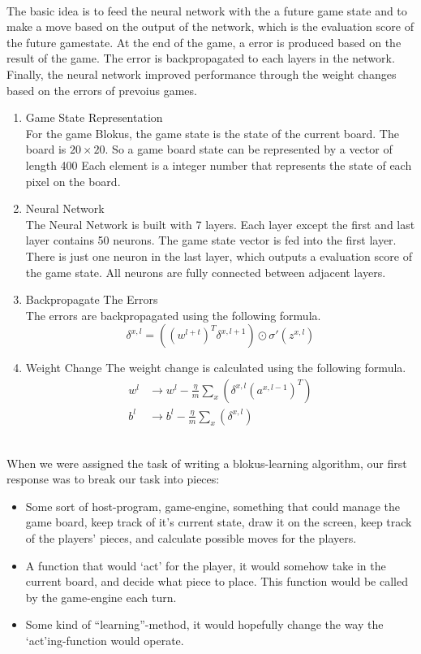 \documentclass{report}
\begin{document}
	\\
	The basic idea is to feed the neural network with the a future game state and to make a move based on the output of the network, which is the evaluation score of the future gamestate.
	At the end of the game, a error is produced based on the result of the game. The error is backpropagated to each layers in the network. Finally, the neural network improved performance through
	the weight changes based on the errors of prevoius games.
	\begin{enumerate}
		\item Game State Representation\\
			For the game Blokus, the game state is the state of the current board. The board is $20\times20$. So a game board state can be represented by a vector of length 400
			Each element is a integer number that represents the state of each pixel on the board. 
		\item Neural Network\\
			The Neural Network is built with 7 layers. Each layer except the first and last layer contains 50 neurons. The game state vector is fed into the first layer. There is just one
			neuron in the last layer, which outputs a evaluation score of the game state. All neurons are fully connected between adjacent layers. 
		\item Backpropagate The Errors\\
			The errors are backpropagated using the following formula.
				\begin{equation*}
				\delta^{x, l} = \left( \left( w^{l+t} \right)^T \delta^{x, l+1} \right) \odot  \sigma'\left( z^{x, l}\right)
				\end{equation*}
		\item Weight Change
			The weight change is calculated using the following formula.
				\begin{align*}
					w^l &\rightarrow w^l - \frac{\eta}{m} \sum_{x} \left(\delta^{x, l} \left( a^{x, l-1}\right) ^T\right) \\
					b^l &\rightarrow b^l - \frac{\eta}{m} \sum_{x} \left(\delta^{x, l}\right)
				\end{align*}
	\end{enumerate}
	\\
	When we were assigned the task of writing a blokus-learning algorithm, our first response was to break our task into pieces:
	\begin{itemize}
		\item Some sort of host-program, game-engine, something that could manage the game board, keep track of it's current state, draw it on the screen, keep track of the players' pieces,
			and calculate possible moves for the players.
		\item A function that would `act' for the player, it would somehow take in the current board, and decide what piece to place. This function would be called by the game-engine each
			turn.
		\item Some kind of ``learning''-method, it would hopefully change the way the `act'ing-function would operate.
	\end{itemize}
\end{document}
